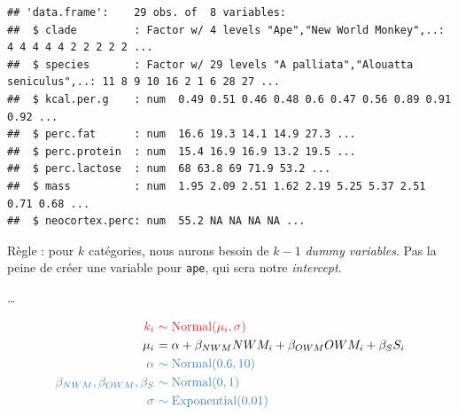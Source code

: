 \documentclass[
  a4paper,11pt,twoside,onecolumn,openright,final,oldfontcommands]{memoir}
\newenvironment{Shaded}{\begin{snugshade}}{\end{snugshade}}
\newcommand{\DecValTok}[1]{\textcolor[rgb]{0.00,0.00,0.81}{#1}}
\newcommand{\FunctionTok}[1]{\textcolor[rgb]{0.00,0.00,0.00}{#1}}
\newcommand{\NormalTok}[1]{#1}
\newcommand{\OtherTok}[1]{\textcolor[rgb]{0.56,0.35,0.01}{#1}}
\newcommand{\SpecialCharTok}[1]{\textcolor[rgb]{0.00,0.00,0.00}{#1}}
\newcommand{\StringTok}[1]{\textcolor[rgb]{0.31,0.60,0.02}{#1}}
\theoremstyle{definition}
\theoremstyle{definition}
\theoremstyle{definition}
\theoremstyle{definition}
\theoremstyle{remark}
\begin{document}
\begin{verbatim}
## 'data.frame':    29 obs. of  8 variables:
##  $ clade         : Factor w/ 4 levels "Ape","New World Monkey",..: 4 4 4 4 4 2 2 2 2 2 ...
##  $ species       : Factor w/ 29 levels "A palliata","Alouatta seniculus",..: 11 8 9 10 16 2 1 6 28 27 ...
##  $ kcal.per.g    : num  0.49 0.51 0.46 0.48 0.6 0.47 0.56 0.89 0.91 0.92 ...
##  $ perc.fat      : num  16.6 19.3 14.1 14.9 27.3 ...
##  $ perc.protein  : num  15.4 16.9 16.9 13.2 19.5 ...
##  $ perc.lactose  : num  68 63.8 69 71.9 53.2 ...
##  $ mass          : num  1.95 2.09 2.51 1.62 2.19 5.25 5.37 2.51 0.71 0.68 ...
##  $ neocortex.perc: num  55.2 NA NA NA NA ...
\end{verbatim}

Règle : pour \(k\) catégories, nous aurons besoin de \(k - 1\) \emph{dummy variables}. Pas la peine de créer une variable pour \texttt{ape}, qui sera notre \emph{intercept}.

\begin{Shaded}
\end{Shaded}

\ldots{}

\[
\begin{aligned}
\color{orangered}{k_{i}} \ &\color{orangered}{\sim \mathrm{Normal}(\mu_{i}, \sigma)} \\
\color{black}{\mu_{i}} \ &\color{black}{= \alpha + \beta_{NWM}NWM_{i} + \beta_{OWM}OWM_{i} + \beta_{S}S_{i}} \\
\color{steelblue}{\alpha} \ &\color{steelblue}{\sim \mathrm{Normal}(0.6, 10)} \\
\color{steelblue}{\beta_{NWM}, \beta_{OWM}, \beta_{S}} \ &\color{steelblue}{\sim \mathrm{Normal}(0, 1)} \\
\color{steelblue}{\sigma} \ &\color{steelblue}{\sim \mathrm{Exponential}(0.01)}
\end{aligned}
\]
\end{document}
